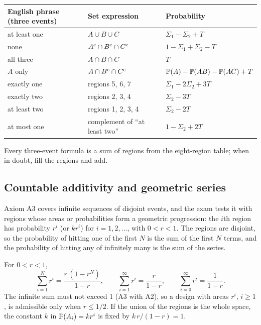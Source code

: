 \begin{center}
\begin{tabular}{@{}lll@{}}
\toprule
English phrase (three events) & Set expression & Probability \\
\midrule
at least one                        & $A \cup B \cup C$                          & $\Sigma_1 - \Sigma_2 + T$ \\
none                                & $A^{\mathrm{c}}\cap B^{\mathrm{c}}\cap C^{\mathrm{c}}$               & $1 - \Sigma_1 + \Sigma_2 - T$ \\
all three                           & $A \cap B \cap C$                          & $T$ \\
$A$ only                            & $A \cap B^{\mathrm{c}} \cap C^{\mathrm{c}}$                & $\mathbb{P}(A) - \mathbb{P}(AB) - \mathbb{P}(AC) + T$ \\
exactly one                         & regions 5, 6, 7                            & $\Sigma_1 - 2\Sigma_2 + 3T$ \\
exactly two                         & regions 2, 3, 4                            & $\Sigma_2 - 3T$ \\
at least two                        & regions 1, 2, 3, 4                         & $\Sigma_2 - 2T$ \\
at most one                         & complement of ``at least two''             & $1 - \Sigma_2 + 2T$ \\
\bottomrule
\end{tabular}
\end{center}
Every three-event formula is a sum of regions from the eight-region table; when in
doubt, fill the regions and add.

\subsection{Countable additivity and geometric series}

Axiom A3 covers infinite sequences of disjoint events, and the exam tests it with
regions whose areas or probabilities form a geometric progression: the $i$th region
has probability $r^i$ (or $k r^i$) for $i = 1, 2, \ldots$, with $0 < r < 1$. The regions
are disjoint, so the probability of hitting one of the first $N$ is the sum of the
first $N$ terms, and the probability of hitting any of infinitely many is the sum of
the series.

\begin{keyfact}
For $0 < r < 1$,
\[
  \sum_{i=1}^{N} r^i = \frac{r\,(1 - r^N)}{1 - r},
  \qquad
  \sum_{i=1}^{\infty} r^i = \frac{r}{1 - r},
  \qquad
  \sum_{i=0}^{\infty} r^i = \frac{1}{1 - r}.
\]
The infinite sum must not exceed $1$ (A3 with A2), so a design with areas $r^i$,
$i \ge 1$, is admissible only when $r \le 1/2$. If the union of the regions is the
whole space, the constant $k$ in $\mathbb{P}(A_i) = k r^i$ is fixed by
$k\,r/(1-r) = 1$.
\end{keyfact}

